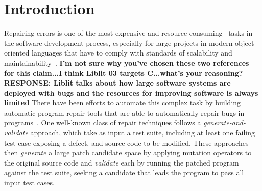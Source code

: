 \documentclass[conference]{IEEEtran}
\newcommand{\todo}[1]
  {{\scriptsize \textbf{\color{red} {#1}}}}
\begin{document}
\section{Introduction} \label{introduction}



Repairing errors is one of the most expensive\cite{Tassey02,Britton13} and 
resource consuming~\cite{Weiss07} tasks in 
the software development process, especially for large projects in modern 
object-oriented languages that have to comply with standards of scalability and 
maintainability~\cite{Liblit03,Anvik05}. \todo{I'm not sure why you've chosen these two references for this claim...I think Liblit 03 targets C...what's your reasoning? RESPONSE: Liblit talks about how large software systems are deployed with bugs and the resources for improving software is always limited}
%
There have been efforts to automate this complex task by 
building automatic program repair tools that are able to automatically repair 
bugs in programs~\cite{legoues12,kim2013,Weimer13,fan15,long15,debroy10,perkins09,wei10}. One well-known class of repair techniques follows a 
\emph{generate-and-validate} approach, which take as input a test suite, including at
least one failing test case exposing
a defect, and source code to be 
modified.  These approaches then \emph{generate} a large patch candidate space by applying 
mutation operators to the original source code and \emph{validate} each by
running the patched  program against the test suite, seeking a candidate that
leads the program to pass all input test cases. 
\end{document}
